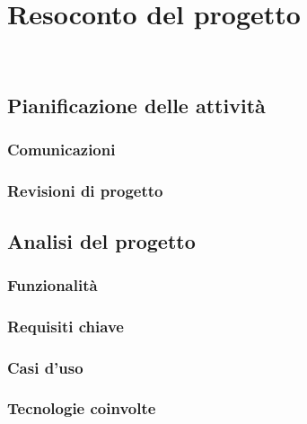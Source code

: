 
\chapter{Resoconto del progetto}
\label{cap:resoconto-progetto}

\\

\section{Pianificazione delle attività}
\subsection{Comunicazioni}
\subsection{Revisioni di progetto}

\section{Analisi del progetto}
\subsection{Funzionalità}
\subsection{Requisiti chiave}
\subsection{Casi d'uso}
\subsection{Tecnologie coinvolte}


